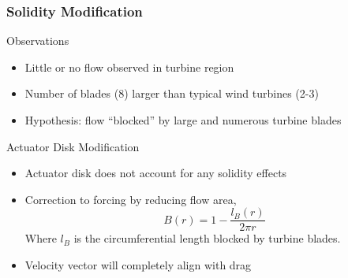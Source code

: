 \documentclass[mathserif]{beamer}
\begin{document}
%
%
\begin{frame}
 \frametitle{Solidity Modification}

 \begin{block}{Observations}
   \begin{itemize}
   \item Little or no flow observed in turbine region
   \item Number of blades (8) larger than typical wind turbines (2-3)
   \item Hypothesis: flow ``blocked'' by large and numerous turbine blades
   \end{itemize}
 \end{block}

 \begin{block}{Actuator Disk Modification}
   \begin{itemize}
   \item Actuator disk does not account for any solidity effects
   \item Correction to forcing by reducing flow area,
     \begin{equation}
       B(r) = 1- \frac{l_B(r)}{2 \pi r}
     \end{equation}
     Where $l_B$ is the circumferential length blocked by turbine blades.
   \item Velocity vector will completely align with drag	 
   \end{itemize}
 \end{block}
\end{frame}
\end{document}
